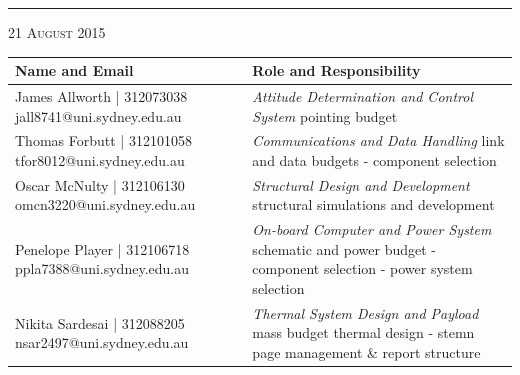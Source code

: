 \begin{titlepage}
\begin{center}
\begin{minipage}{\linewidth}
    \vspace{1.5cm}
    \hrule
    \vspace{1.3cm}
     {\large \textsc{21 August 2015}}
\vspace{1.3cm}
    \begin{table}[H]
        \centering
        \vspace{0.2cm}
        \label{tab:maxturbulencealpha}
        {\renewcommand{\arraystretch}{1.7}%
            \begin{tabular}{|>{\centering\arraybackslash}m{6cm}|>{\centering\arraybackslash}m{9cm}|}
                \hline
                \textbf{Name and Email} & \textbf{Role and Responsibility} \\ \hline\hline
                James Allworth | 312073038  jall8741@uni.sydney.edu.au & \textit{Attitude Determination and Control System} \newline pointing budget  \\\hline
                Thomas Forbutt | 312101058  tfor8012@uni.sydney.edu.au & \textit{Communications and Data Handling} \newline link and data budgets - component selection \\\hline
                Oscar McNulty | 312106130  omcn3220@uni.sydney.edu.au & \textit{Structural Design and Development} \newline structural simulations and development \\\hline
                Penelope Player | 312106718  ppla7388@uni.sydney.edu.au & \textit{On-board Computer and Power System} \newline schematic and power budget - component selection - power system selection \\\hline
                Nikita Sardesai | 312088205  nsar2497@uni.sydney.edu.au & \textit{Thermal System Design and Payload} \newline mass budget thermal design - stemn page management \& report structure \\\hline
                \end{tabular} } 
        \end{table}
    
\end{minipage}
\end{center}

\end{titlepage}